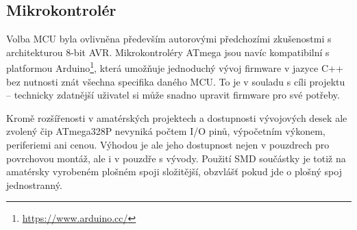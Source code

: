 \subsection{Mikrokontrolér}
Volba MCU byla ovlivněna především autorovými předchozími zkušenostmi
s architekturou 8-bit AVR. Mikrokontroléry ATmega jsou navíc kompatibilní
s platformou Arduino\footnote{\url{https://www.arduino.cc/}}, která umožňuje
jednoduchý vývoj firmware v jazyce C++ bez nutnosti znát všechna specifika
daného MCU. To je v souladu s cíli projektu -- technicky zdatnější uživatel si
může snadno upravit firmware pro své potřeby.

Kromě rozšířenosti v amatérských projektech a dostupnosti vývojových desek ale
zvolený čip ATmega328P nevyniká počtem I/O pinů, výpočetním výkonem,
periferiemi ani cenou. Výhodou je ale jeho dostupnost nejen v pouzdrech pro
povrchovou montáž, ale i v pouzdře s vývody. Použití SMD součástky je totiž na
amatérsky vyrobeném plošném spoji složitější, obzvlášť pokud jde o plošný spoj
jednostranný.

\nocite{dshATmega328} %
